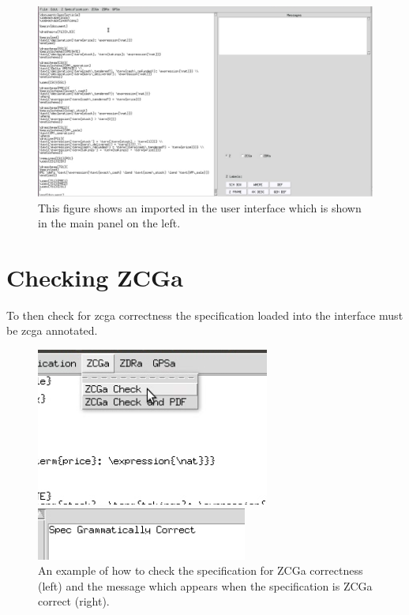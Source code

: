 \begin{figure}[H]
\includegraphics[scale=0.37]{Figures/Interface/specinserted.png}
\caption{This figure shows an imported in the user interface which is shown in the main panel on the left. \label{fig:specinserted}}
\end{figure}

\section{Checking ZCGa}
To then check for \gls{zcga} correctness the specification loaded into the
interface must be \gls{zcga} annotated.

\begin{figure}[H]
\centering
\begin{minipage}{0.45\textwidth}
\centering
\includegraphics[scale=0.6]{Figures/Interface/zcgacheck.png}
\end{minipage}\hfill
\begin{minipage}{0.45\textwidth}
\centering
\includegraphics[scale=0.7]{Figures/Interface/zcgacorrect.png}
\end{minipage}
\caption{An example of how to check the specification for ZCGa correctness (left) and the message which appears when the specification is ZCGa correct (right).  \label{fig:zchecheck}}
\end{figure}

